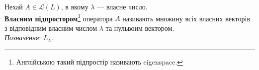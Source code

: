 \documentclass{math_library}
\begin{document}
\iffalse
\begin{proposition}[Додаткові властивості власних чисел та векторів]
Нехай $A \in \mathcal{L}(L)$. Тоді:
\begin{enumerate}[nosep, wide=0pt, label={\arabic*)}]
\item $f$ --- власний вектор оператора $A$ з власним числом $\lambda \iff$ $f$ -- власний вектор оператора $(A - \mu I)$ з власним числом $(\lambda - \mu)$;
\item Якщо $\{g_1,\dots,g_n\}$ --- базис $L$ та $\mathbb{A}_g$ --- матриця $A$ для нашого базису, то $\lambda$ --- власне число $A$ $\iff$ $\lambda$ --- власне число $\mathbb{A}_g$ та $f$ -- власний вектор $A$ з власним числом $\lambda$ $\iff$ $J_g f$ --- власний вектор $\mathbb{A}_g$.
\end{enumerate}
\end{proposition}

\begin{proof}
\begin{enumerate}[topsep =0pt, wide=0pt, label={\arabic*)},topsep=-\parskip]
\item $f$ -- власний вектор $A$ з власним числом $\lambda \iff Af = \lambda f \iff Af - \mu f = \lambda f - \mu f \iff \\ \iff Af - \mu If = (\lambda - \mu)f \iff (A-\mu I)f = (\lambda - \mu)f \iff$ $f$ -- власний вектор $(A- \mu I)$ з власним число $(\lambda - \mu)$.

\item Маємо наступну картину:\\
\begin{tikzcd}
L \arrow{r}{A} \arrow{d}[swap]{J_g} & L \arrow{d}{J_g} \\
\mathbb{R}^n \arrow{r}{\mathbb{A}_g} & \mathbb{R}^n
\end{tikzcd}\\
Тоді $Af = J_g^{-1} \mathbb{A}_g J_g f = \lambda f$. Обидві частини множимо на $J_g \implies \mathbb{A}_g (J_g f) = \lambda (J_g f)$. \qedhere
\end{enumerate}
\end{proof}
\fi

\begin{definition}
Нехай $A \in \mathcal{L}(L)$, в якому $\lambda$ --- власне число.\\
\textbf{Власним підпростором}\footnote{Англійською такий підпростір називають eigenspace.} оператора $A$ називають множину всіх власних векторів з відповідним власним числом $\lambda$ та нульвоим вектором.\\
\textit{Позначення}: $L_{\lambda}$.
\end{definition}
\end{document}
